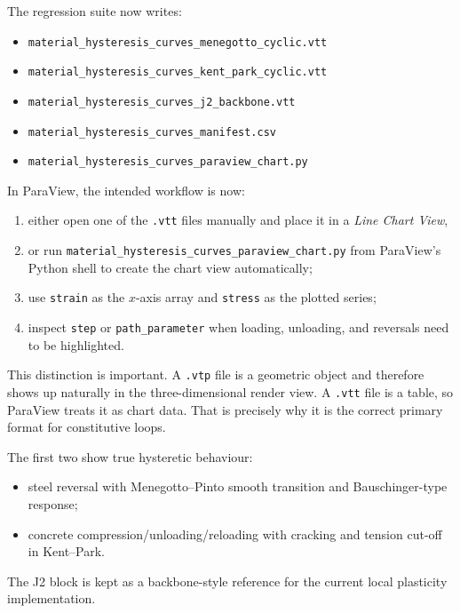 The regression suite now writes:

\begin{itemize}
  \item \texttt{material\_hysteresis\_curves\_menegotto\_cyclic.vtt}
  \item \texttt{material\_hysteresis\_curves\_kent\_park\_cyclic.vtt}
  \item \texttt{material\_hysteresis\_curves\_j2\_backbone.vtt}
  \item \texttt{material\_hysteresis\_curves\_manifest.csv}
  \item \texttt{material\_hysteresis\_curves\_paraview\_chart.py}
\end{itemize}

In ParaView, the intended workflow is now:

\begin{enumerate}
  \item either open one of the \texttt{.vtt} files manually and place it in a
        \emph{Line Chart View},
  \item or run \texttt{material\_hysteresis\_curves\_paraview\_chart.py} from
        ParaView's Python shell to create the chart view automatically;
  \item use \texttt{strain} as the \(x\)-axis array and \texttt{stress} as the
        plotted series;
  \item inspect \texttt{step} or \texttt{path\_parameter} when loading,
        unloading, and reversals need to be highlighted.
\end{enumerate}

This distinction is important.  A \texttt{.vtp} file is a geometric object and
therefore shows up naturally in the three-dimensional render view. A
\texttt{.vtt} file is a table, so ParaView treats it as chart data. That is
precisely why it is the correct primary format for constitutive loops.

The first two show true hysteretic behaviour:

\begin{itemize}
  \item steel reversal with Menegotto--Pinto smooth transition and
        Bauschinger-type response;
  \item concrete compression/unloading/reloading with cracking and tension
        cut-off in Kent--Park.
\end{itemize}

The J2 block is kept as a backbone-style reference for the current local
plasticity implementation.

